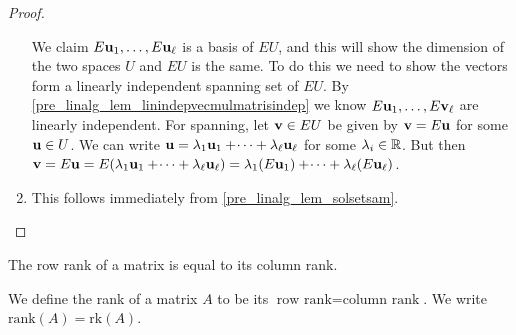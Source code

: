 \documentclass[10pt, a4paper]{article}
\begin{document}
\begin{proposition}
\begin{proof}
\begin{enumerate}[label = (\roman*)]
            We claim $E\mathbf{u}_1, \dotsc, E\mathbf{u}_{\ell}$ is a basis of $EU$,
            and this will show the dimension of the two spaces $U$ and $EU$ is the same.
            To do this we need to show the vectors form a linearly independent spanning set of $EU$.
            By \autoref{pre_linalg_lem_linindepvecmulmatrisindep} we know $E\mathbf{u}_1, \dotsc, E\mathbf{v}_{\ell}$ are linearly independent.
            For spanning,
            let $\mathbf{v} \in EU$ be given by $\mathbf{v} = E\mathbf{u}$ for some $\mathbf{u} \in U$.
            We can write $\mathbf{u} = \lambda_1\mathbf{u}_1 + \dotsi + \lambda_{\ell}\mathbf{u}_{\ell}$ for some $\lambda_i \in \mathbb{R}$.
            But then $\mathbf{v} = E\mathbf{u} = E(\lambda_1\mathbf{u}_1 + \dotsi + \lambda_{\ell}\mathbf{u}_{\ell}) = \lambda_1(E\mathbf{u}_1) + \dotsi + \lambda_{\ell}(E\mathbf{u}_{\ell})$.
            \item This follows immediately from \autoref{pre_linalg_lem_solsetsam}.
        \end{enumerate}
    \end{proof}
\end{proposition}

\begin{theorem}\label{pre_linalg_thm_ranktheorem}
    The row rank of a matrix is equal to its column rank.
\end{theorem}

\begin{definition}[Rank]
    We define the rank of a matrix $A$ to be its $\text{row rank} = \text{column rank}$.
    We write $\mathrm{rank}(A) = \mathrm{rk}(A)$.
\end{definition}
\end{document}

